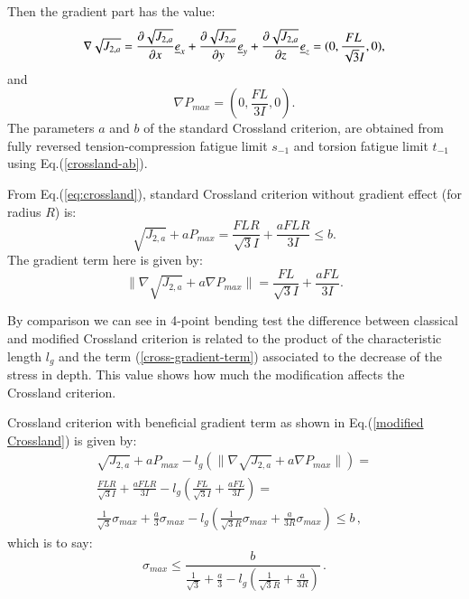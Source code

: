 \documentclass[3p,times,procedia,number]{elsarticle}
\begin{document}
Then the gradient part has the value:
\begin{equation}
\nabla\sqrt{J_{2,a}}=\frac{\partial\sqrt{J_{2,a}}}{\partial x}\uline{e}_x+\frac{\partial\sqrt{J_{2,a}}}{\partial y}\uline{e}_y+\frac{\partial\sqrt{J_{2,a}}}{\partial z}\uline{e}_z=(0,\frac{FL}{\sqrt{3}I},0) ,
\end{equation}
and
\begin{equation}
\nabla P_{max}=(0,\frac{FL}{3I},0).
\end{equation}
The parameters $a$ and $b$ of the standard Crossland criterion, are obtained from fully reversed tension-compression fatigue limit $s_{-1}$  and torsion fatigue limit $t_{-1}$ using Eq.(\ref{crossland-ab}).

From Eq.(\ref{eq:crossland}), standard Crossland criterion without gradient effect (for radius $R$) is:
\begin{equation}
\sqrt{J_{2,a}}+aP_{max}=\frac{FLR}{\sqrt{3}I} +\frac{aFLR}{3I}\leqslant b.
\label{eq4pcross}
\end{equation}
The gradient term here is given by:
\begin{equation}
\parallel{\nabla\sqrt{J_{2,a}}}+a{\nabla P_{max}}\parallel=\frac{FL}{\sqrt{3}I}+\frac{aFL}{3I}.
\label{cross-gradient-term}
\end{equation}

By comparison we can see in 4-point bending test the difference between classical and modified Crossland criterion is related to the product of the characteristic length $l_g$ and the term (\ref{cross-gradient-term}) associated to the decrease of the stress in depth. This value shows how much the modification affects the Crossland criterion. 

\noindent Crossland criterion with beneficial gradient term as shown in Eq.(\ref{modified Crossland}) is given by:
\begin{equation}
\begin{split}
\sqrt{J_{2,a}}+aP_{max}-l_g(\parallel{\nabla\sqrt{J_{2,a}}}+a\nabla{P_{max}}\parallel)=\\ \frac{FLR}{\sqrt{3}I} +\frac{aFLR}{3I}-l_g(\frac{FL}{\sqrt{3}I}+\frac{aFL}{3I})=\\ \frac{1}{\sqrt{3}}\sigma_{max}+\frac{a}{3}\sigma_{max}-l_g(\frac{1}{\sqrt{3}R}\sigma_{max}+\frac{a}{3R}\sigma_{max})\leqslant b\, ,
\end{split}
\end{equation}
which is to say:
\begin{equation}
\sigma_{max}\leqslant\frac{b}{\frac{1}{\sqrt{3}}+\frac{a}{3}-l_g(\frac{1}{\sqrt{3}R}+\frac{a}{3R})}\, .
\end{equation}
\end{document}
